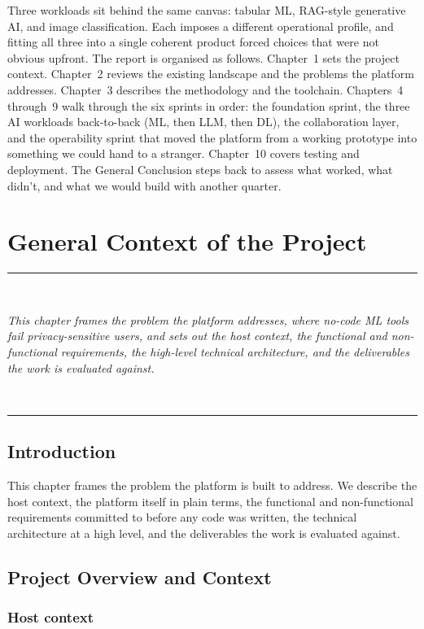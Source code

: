 \documentclass[12pt, a4paper, oneside]{report}
\newcommand{\chapterabstract}[1]{%
  \vspace*{1.2cm}%
  \begin{center}%
  \rule{0.45\textwidth}{0.4pt}\\[0.8em]%
  \begin{minipage}{0.82\textwidth}\centering\itshape\large #1\end{minipage}\\[0.8em]%
  \rule{0.45\textwidth}{0.4pt}%
  \end{center}%
  \vspace*{\fill}\clearpage}
\begin{document}
Three workloads sit behind the same canvas: tabular ML, RAG-style
generative AI, and image classification. Each imposes a different
operational profile, and fitting all three into a single coherent
product forced choices that were not obvious upfront. The report is
organised as follows. Chapter~1 sets the project context. Chapter~2
reviews the existing landscape and the problems the platform addresses.
Chapter~3 describes the methodology and the toolchain. Chapters~4
through~9 walk through the six sprints in order: the foundation sprint,
the three AI workloads back-to-back (ML, then LLM, then DL), the
collaboration layer, and the operability sprint that moved the
platform from a working prototype into something we could hand to a
stranger. Chapter~10 covers testing and deployment. The General
Conclusion steps back to assess what worked, what didn't, and what we
would build with another quarter.

\newpage

\chapter{General Context of the Project}
\chapterabstract{This chapter frames the problem the platform addresses, where
no-code ML tools fail privacy-sensitive users, and sets out the host context,
the functional and non-functional requirements, the high-level technical
architecture, and the deliverables the work is evaluated against.}

\section*{Introduction}

This chapter frames the problem the platform is built to address. We
describe the host context, the platform itself in plain terms, the
functional and non-functional requirements committed to before any
code was written, the technical architecture at a high level, and the
deliverables the work is evaluated against.

\section{Project Overview and Context}

\subsection{Host context}
\end{document}
